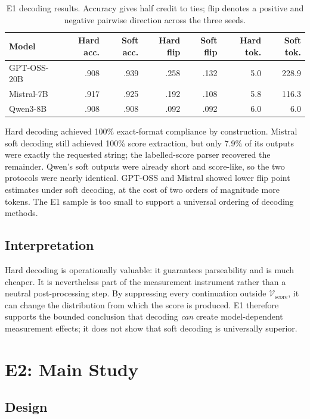 \documentclass[11pt,twoside,a4paper]{report}
\begin{document}
\begin{table}[htbp]
\centering
\caption{E1 decoding results.  Accuracy gives half credit to ties; flip denotes a
positive and negative pairwise direction across the three seeds.}
\label{tab:e1-results}
\begin{tabular}{lrrrrrr}
\toprule
Model & Hard acc. & Soft acc. & Hard flip & Soft flip & Hard tok. & Soft tok. \\
\midrule
GPT-OSS-20B & .908 & .939 & .258 & .132 & 5.0 & 228.9 \\
Mistral-7B & .917 & .925 & .192 & .108 & 5.8 & 116.3 \\
Qwen3-8B & .908 & .908 & .092 & .092 & 6.0 & 6.0 \\
\bottomrule
\end{tabular}
\end{table}

Hard decoding achieved 100\% exact-format compliance by construction.  Mistral soft
decoding still achieved 100\% score extraction, but only 7.9\% of its outputs were
exactly the requested string; the labelled-score parser recovered the remainder.
Qwen's soft outputs were already short and score-like, so the two protocols were
nearly identical.  GPT-OSS and Mistral showed lower flip point estimates under soft
decoding, at the cost of two orders of magnitude more tokens.  The E1 sample is too
small to support a universal ordering of decoding methods.

\subsection{Interpretation}

Hard decoding is operationally valuable: it guarantees parseability and is much
cheaper.  It is nevertheless part of the measurement instrument rather than a
neutral post-processing step.  By suppressing every continuation outside
$\mathcal V_{\mathrm{score}}$, it can change the distribution from which the score
is produced.  E1 therefore supports the bounded conclusion that decoding
\emph{can} create model-dependent measurement effects; it does not show that soft
decoding is universally superior.

\section{E2: Main Study}
\label{sec:e2}

\subsection{Design}
\end{document}
